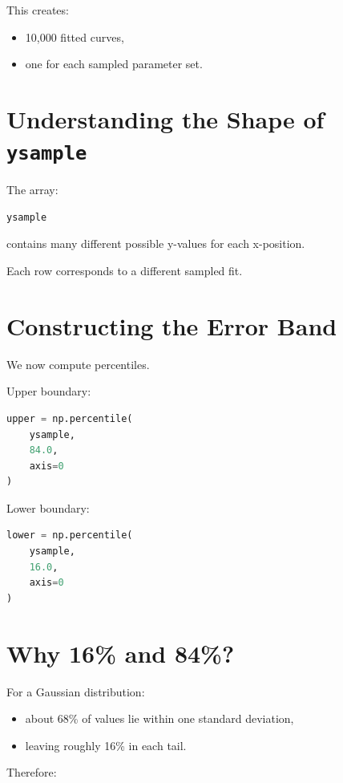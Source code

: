 \documentclass[11pt]{article}
\begin{document}
This creates:

\begin{itemize}
    \item 10,000 fitted curves,
    \item one for each sampled parameter set.
\end{itemize}

\section{Understanding the Shape of \texttt{ysample}}

The array:

\begin{lstlisting}[language=Python]
ysample
\end{lstlisting}

contains many different possible y-values for each x-position.

Each row corresponds to a different sampled fit.

\section{Constructing the Error Band}

We now compute percentiles.

Upper boundary:

\begin{lstlisting}[language=Python]
upper = np.percentile(
    ysample,
    84.0,
    axis=0
)
\end{lstlisting}

Lower boundary:

\begin{lstlisting}[language=Python]
lower = np.percentile(
    ysample,
    16.0,
    axis=0
)
\end{lstlisting}

\section{Why 16\% and 84\%?}

For a Gaussian distribution:

\begin{itemize}
    \item about 68\% of values lie within one standard deviation,
    \item leaving roughly 16\% in each tail.
\end{itemize}

Therefore:
\end{document}
